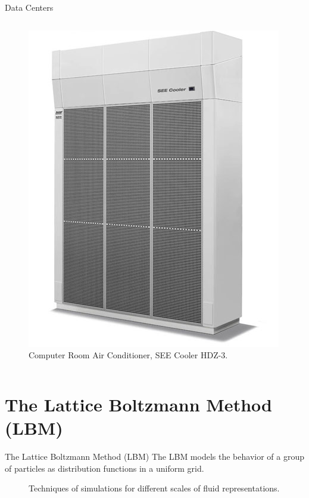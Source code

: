 \documentclass{beamer}
\begin{document}
\begin{frame}{Data Centers}
\begin{columns}[T]
\begin{column}{.5\textwidth}
\begin{figure}[ht]
\begin{center}
\includegraphics[width=0.95\linewidth]{crac.jpg}
\end{center}
\caption{Computer Room Air Conditioner, SEE Cooler HDZ-3.}
\end{figure}
\end{column}%
\end{columns}
\end{frame}

\section{The Lattice Boltzmann Method (LBM)}
\begin{frame}{The Lattice Boltzmann Method (LBM)}
The LBM models the behavior of a group of particles as distribution functions in a uniform grid.
\begin{figure}[H]
\centering
\begin{scriptsize}
\def\svgwidth{\linewidth}

\end{scriptsize}
\caption{Techniques of simulations for different scales of fluid representations.}
\label{fig:scales}
\end{figure}
\end{frame}
\end{document}
